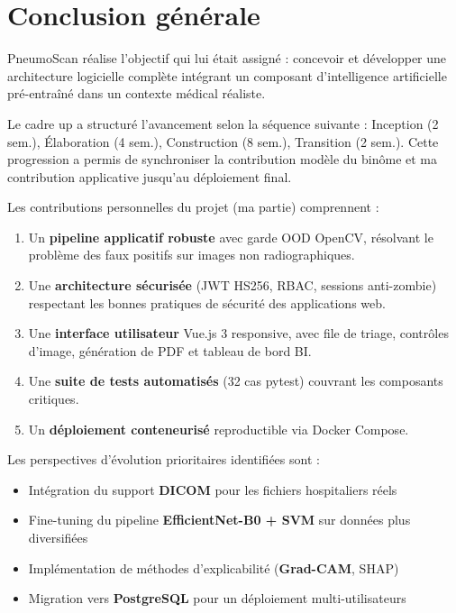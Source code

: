 \documentclass[12pt, a4paper]{report}
\begin{document}
\chapter*{Conclusion générale}

PneumoScan réalise l'objectif qui lui était assigné : concevoir et développer
une architecture logicielle complète intégrant un composant d'intelligence
artificielle pré-entraîné dans un contexte médical réaliste.

Le cadre \acrshort{up} a structuré l'avancement selon la séquence suivante :
Inception (2 sem.), Élaboration (4 sem.), Construction (8 sem.), Transition (2 sem.).
Cette progression a permis de synchroniser la contribution modèle du binôme et
ma contribution applicative jusqu'au déploiement final.

\vspace{8pt}
\noindent Les contributions personnelles du projet (ma partie) comprennent :
\begin{enumerate}
  \item Un \textbf{pipeline applicatif robuste} avec garde OOD OpenCV,
        résolvant le problème des faux positifs sur images non radiographiques.
  \item Une \textbf{architecture sécurisée} (JWT HS256, RBAC, sessions anti-zombie)
        respectant les bonnes pratiques de sécurité des applications web.
  \item Une \textbf{interface utilisateur} Vue.js 3 responsive, avec file de triage,
        contrôles d'image, génération de PDF et tableau de bord BI.
  \item Une \textbf{suite de tests automatisés} (32 cas pytest) couvrant les
        composants critiques.
  \item Un \textbf{déploiement conteneurisé} reproductible via Docker Compose.
\end{enumerate}

\vspace{6pt}
\noindent Les perspectives d'évolution prioritaires identifiées sont :
\begin{itemize}
  \item Intégration du support \textbf{DICOM} pour les fichiers hospitaliers réels
  \item Fine-tuning du pipeline \textbf{EfficientNet-B0 + SVM} sur données plus diversifiées
  \item Implémentation de méthodes d'explicabilité (\textbf{Grad-CAM}, SHAP)
  \item Migration vers \textbf{PostgreSQL} pour un déploiement multi-utilisateurs
\end{itemize}
\end{document}

